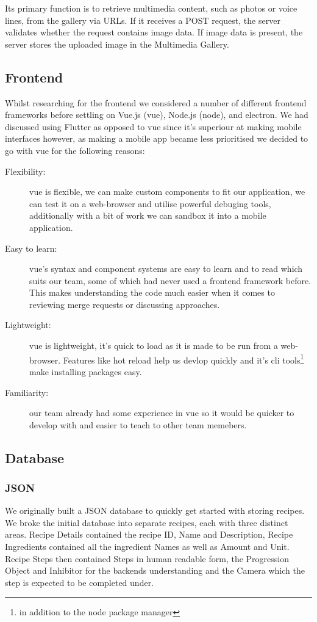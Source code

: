 \documentclass{article}
\begin{document}
Its primary function is to retrieve multimedia content, such as photos or voice lines, from the gallery via URLs. If it receives a POST request, the server validates whether the request contains image data. If image data is present, the server stores the uploaded image in the Multimedia Gallery.

\subsection{Frontend}
Whilst researching for the frontend we considered a number of different frontend frameworks before settling on Vue.js (vue), Node.js (node), and electron. We had discussed using Flutter as opposed to vue since it's superiour at making mobile interfaces however, as making a mobile app became less prioritised we decided to go with vue for the following reasons:
\begin{description}
  \item[Flexibility:] vue is flexible, we can make custom components to fit our application, we can test it on a web-browser and utilise powerful debuging tools, additionally with a bit of work we can sandbox it into a mobile application.
  \item[Easy to learn:] vue's syntax and component systems are easy to learn and to read which suits our team, some of which had never used a frontend framework before. This makes understanding the code much easier when it comes to reviewing merge requests or discussing approaches.
  \item[Lightweight:] vue is lightweight, it's quick to load as it is made to be run from a web-browser. Features like hot reload help us devlop quickly and it's cli tools\footnote{in addition to the node package manager} make installing packages easy.
  \item[Familiarity:] our team already had some experience in vue so it would be quicker to develop with and easier to teach to other team memebers.
\end{description}



\subsection{Database}
\subsubsection{JSON}
We originally built a JSON database to quickly get started with storing recipes. We broke the initial database into separate recipes, each with three distinct areas. Recipe Details contained the recipe ID, Name and Description, Recipe Ingredients contained all the ingredient Names as well as Amount and Unit. Recipe Steps then contained Steps in human readable form, the Progression Object and Inhibitor for the backends understanding and the Camera which the step is expected to be completed under.
\end{document}
